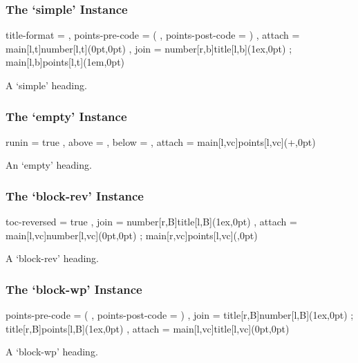 \documentclass[DIV10,toc=index,toc=bib,numbers=noendperiod]{cnpkgdoc}
\begin{document}
\subsubsection{The `simple' Instance}
\begin{beispiel}
  {
    title-format     = \normalsize ,
    points-pre-code  = ( ,
    points-post-code = ) ,
    attach           = { main[l,t]number[l,t](0pt,0pt) } ,
    join             =
      {
        number[r,b]title[l,b](1ex,0pt) ;
        main[l,b]points[l,t](1em,0pt)
      }
  }
\end{beispiel}
\begin{question}{1}
 A `simple' heading. \sample
\end{question}

\subsubsection{The `empty' Instance}
\begin{beispiel}
  {
    runin  = true ,
    above  = \parskip ,
    below  = \parskip ,
    attach = { main[l,vc]points[l,vc](\linewidth+\marginparsep,0pt) }
  }
\end{beispiel}
\begin{question}{1}
 An `empty' heading. \sample
\end{question}

\subsubsection{The `block-rev' Instance}
\begin{beispiel}
  {
    toc-reversed     = true ,
    join             = { number[r,B]title[l,B](1ex,0pt) } ,
    attach           =
      {
        main[l,vc]number[l,vc](0pt,0pt) ;
        main[r,vc]points[l,vc](\marginparsep,0pt)
      }
  }
\end{beispiel}
\begin{question}{1}
 A `block-rev' heading. \sample
\end{question}

\subsubsection{The `block-wp' Instance}
\begin{beispiel}
  {
    points-pre-code  = ( ,
    points-post-code = ) ,
    join             =
      {
        title[r,B]number[l,B](1ex,0pt) ;
        title[r,B]points[l,B](1ex,0pt)
      } ,
    attach           = { main[l,vc]title[l,vc](0pt,0pt) }
  }
\end{beispiel}
\begin{question}{1}
 A `block-wp' heading. \sample
\end{question}
\end{document}

